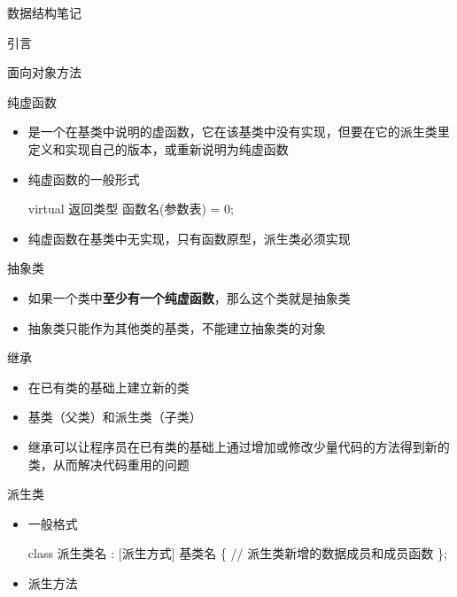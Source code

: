 \documentclass[
  ignorenonframetext,
]{beamer}
\newenvironment{Shaded}{}{}
\newcommand{\NormalTok}[1]{#1}
\providecommand{\tightlist}{%
  \setlength{\itemsep}{0pt}\setlength{\parskip}{0pt}}
\begin{document}
\begin{frame}[fragile]{数据结构笔记}
\begin{block}{引言}
\begin{block}{面向对象方法}
\begin{block}{纯虚函数}
\protect{}\label{ux7eafux865aux51fdux6570}
\begin{itemize}
\item
  是一个在基类中说明的虚函数，它在该基类中没有实现，但要在它的派生类里定义和实现自己的版本，或重新说明为纯虚函数
\item
  纯虚函数的一般形式

\begin{Shaded}
\begin{Highlighting}[]
\NormalTok{virtual 返回类型 函数名(参数表) = 0;}
\end{Highlighting}
\end{Shaded}
\item
  纯虚函数在基类中无实现，只有函数原型，派生类必须实现
\end{itemize}
\end{block}

\begin{block}{抽象类}
\protect{}\label{ux62bdux8c61ux7c7b}
\begin{itemize}
\tightlist
\item
  如果一个类中\textbf{至少有一个纯虚函数}，那么这个类就是抽象类
\item
  抽象类只能作为其他类的基类，不能建立抽象类的对象
\end{itemize}
\end{block}

\begin{block}{继承}
\protect{}\label{ux7ee7ux627f}
\begin{itemize}
\tightlist
\item
  在已有类的基础上建立新的类
\item
  基类（父类）和派生类（子类）
\item
  继承可以让程序员在已有类的基础上通过增加或修改少量代码的方法得到新的类，从而解决代码重用的问题
\end{itemize}

\begin{block}{派生类}
\protect{}\label{ux6d3eux751fux7c7b}
\begin{itemize}
\item
  一般格式

\begin{Shaded}
\begin{Highlighting}[]
\NormalTok{class 派生类名 : [派生方式] 基类名}
\NormalTok{\{}
\NormalTok{  // 派生类新增的数据成员和成员函数}
\NormalTok{\};}
\end{Highlighting}
\end{Shaded}
\item
  派生方法


\end{itemize}
\end{block}
\end{block}
\end{block}
\end{block}
\end{frame}
\end{document}
